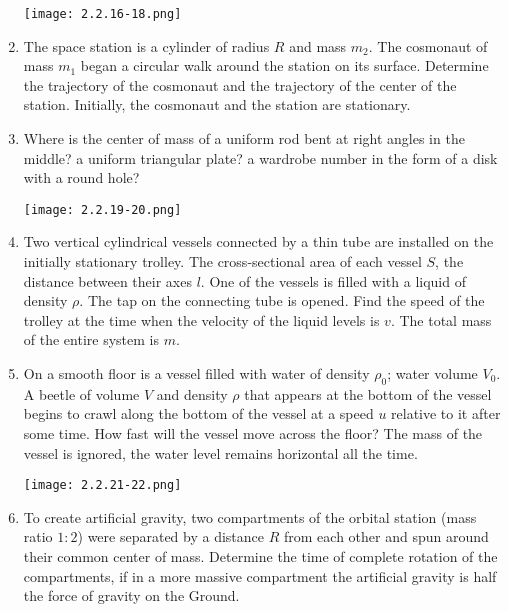 \documentclass{article}
\begin{document}
\begin{enumerate}[label=2.2.\arabic*]
\begin{center}
    \texttt{[image: 2.2.16-18.png]}
\end{center}

\item The space station is a cylinder of radius $R$ and mass $m_2$. The cosmonaut of mass $m_1$ began a circular walk around the station on its surface. Determine the trajectory of the cosmonaut and the trajectory of the center of the station. Initially, the cosmonaut and the station are stationary.

\item Where is the center of mass of a uniform rod bent at right angles in the middle? a uniform triangular plate? a wardrobe number in the form of a disk with a round hole?

\begin{center}
    \texttt{[image: 2.2.19-20.png]}
\end{center}

\item Two vertical cylindrical vessels connected by a thin tube are installed on the initially stationary trolley. The cross-sectional area of each vessel $S$, the distance between their axes $l$. One of the vessels is filled with a liquid of density $\rho$. The tap on the connecting tube is opened. Find the speed of the trolley at the time when the velocity of the liquid levels is $v$. The total mass of the entire system is $m$.

\item On a smooth floor is a vessel filled with water of density $\rho_0$; water volume $V_0$. A beetle of volume $V$ and density $\rho$ that appears at the bottom of the vessel begins to crawl along the bottom of the vessel at a speed $u$ relative to it after some time. How fast will the vessel move across the floor? The mass of the vessel is ignored, the water level remains horizontal all the time.

\begin{center}
    \texttt{[image: 2.2.21-22.png]}
\end{center}

\item To create artificial gravity, two compartments of the orbital station (mass ratio $1 : 2$) were separated by a distance $R$ from each other and spun around their common center of mass. Determine the time of complete rotation of the compartments, if in a more massive compartment the artificial gravity is half the force of gravity on the Ground.


\end{enumerate}
\end{document}
